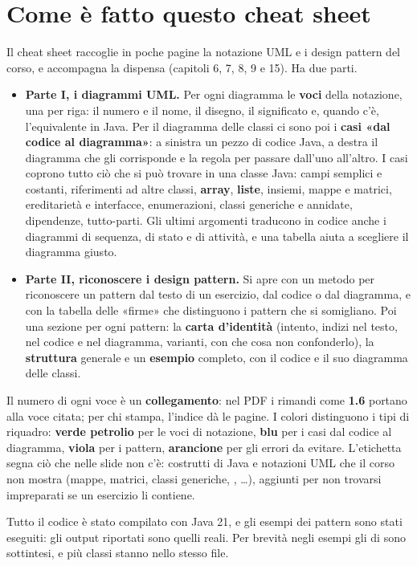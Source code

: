 \section*{Come è fatto questo cheat sheet}
\gdef\currentchapter{Introduzione}

Il cheat sheet raccoglie in poche pagine la notazione UML e i design pattern del corso, e accompagna la dispensa
(capitoli 6, 7, 8, 9 e 15). Ha due parti.
\begin{itemize}[itemsep=2pt]
  \item \textbf{Parte I, i diagrammi UML.} Per ogni diagramma le \textbf{voci} della notazione, una per riga: il
        numero e il nome, il disegno, il significato e, quando c'è, l'equivalente in Java. Per il diagramma delle
        classi ci sono poi i \textbf{casi «dal codice al diagramma»}: a sinistra un pezzo di codice Java, a destra il
        diagramma che gli corrisponde e la regola per passare dall'uno all'altro. I casi coprono tutto ciò che si
        può trovare in una classe Java: campi semplici e costanti, riferimenti ad altre classi, \textbf{array},
        \textbf{liste}, insiemi, mappe e matrici, ereditarietà e interfacce, enumerazioni, classi generiche e
        annidate, dipendenze, tutto-parti. Gli ultimi argomenti traducono in codice anche i diagrammi di sequenza,
        di stato e di attività, e una tabella aiuta a scegliere il diagramma giusto.
  \item \textbf{Parte II, riconoscere i design pattern.} Si apre con un metodo per riconoscere un pattern dal testo
        di un esercizio, dal codice o dal diagramma, e con la tabella delle «firme» che distinguono i pattern che si
        somigliano. Poi una sezione per ogni pattern: la \textbf{carta d'identità} (intento, indizi nel testo, nel
        codice e nel diagramma, varianti, con che cosa non confonderlo), la \textbf{struttura} generale e un
        \textbf{esempio} completo, con il codice e il suo diagramma delle classi.
\end{itemize}

Il numero di ogni voce è un \textbf{collegamento}: nel PDF i rimandi come \textcolor{swblue!80!black}{\Lato\bfseries
1.6} portano alla voce citata; per chi stampa, l'indice dà le pagine. I colori distinguono i tipi di riquadro:
\textcolor{ncolore}{\textbf{verde petrolio}} per le voci di notazione, \textcolor{ccolore}{\textbf{blu}} per i casi
dal codice al diagramma, \textcolor{pcolore}{\textbf{viola}} per i pattern, \textcolor{acolore}{\textbf{arancione}}
per gli errori da evitare. L'etichetta \oltre{} segna ciò che nelle slide non c'è: costrutti di Java e notazioni UML
che il corso non mostra (mappe, matrici, classi generiche, , \ldots), aggiunti per non trovarsi
impreparati se un esercizio li contiene.

Tutto il codice è stato compilato con Java 21, e gli esempi dei pattern sono stati eseguiti: gli output riportati
sono quelli reali. Per brevità negli esempi gli  di  sono sottintesi, e più classi stanno
nello stesso file.
